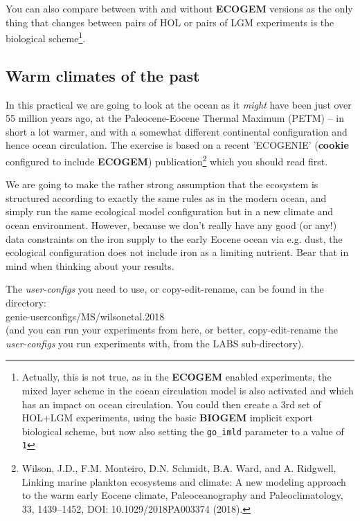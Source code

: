 You can also compare between with and without \textbf{ECOGEM} versions as the only thing that changes between pairs of HOL or pairs of LGM experiments is the biological scheme\footnote{Actually, this is not true, as in the \textbf{ECOGEM} enabled experiments, the mixed layer scheme in the coean circulation model is also activated and which has an impact on ocean circulation. You could then create a 3rd set of HOL+LGM experiments, using the basic \textbf{BIOGEM} implicit export biological scheme, but now also setting the \texttt{go\_imld} parameter to a value of \texttt{1}}.

\newpage
\subsection*{Warm climates of the past}

In this practical we are going to look at the ocean as it \textit{might} have been just over 55 million years ago, at the Paleocene-Eocene Thermal Maximum (PETM) -- in short a lot warmer, and with a somewhat different continental configuration and hence ocean circulation. The exercise is based on a recent 'ECOGENIE' (\textbf{cookie} configured to include \textbf{ECOGEM}) publication\footnote{Wilson, J.D., F.M. Monteiro, D.N. Schmidt, B.A. Ward, and A. Ridgwell, Linking marine plankton ecosystems and climate: A new modeling approach to the warm early Eocene climate, Paleoceanography and Paleoclimatology, 33, 1439–1452, DOI: 10.1029/2018PA003374 (2018).} which you should read first.

We are going to make the rather strong assumption that the ecosystem is structured according to exactly the same rules as in the modern ocean, and simply run the same ecological model configuration but in a new climate and ocean environment. However, because we don't really have any good (or any!) data constraints on the iron supply to the early Eocene ocean via e.g. dust, the ecological configuration does not include iron as a limiting nutrient. Bear that in mind when thinking about your results.

The \textit{user-configs} you need to use, or copy-edit-rename, can be found in the directory:
\vspace{1mm}
\\\textsf{\footnotesize genie-userconfigs/MS/wilsonetal.2018}
\vspace{1mm}
\\\noindent(and you can run your experiments from here, or better, copy-edit-rename the \textit{user-configs} you run experiments with, from the \textsf{\footnotesize LABS} sub-directory).

